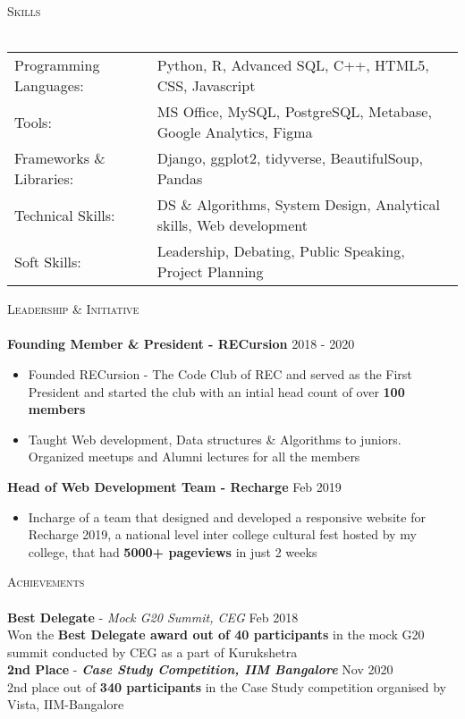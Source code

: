 \documentclass[a4paper]{article}
\newcommand{\lineunder} {
    \vspace*{-8pt} \\
    \hspace*{-18pt} \hrulefill \\
}
\newcommand{\header} [1] {
    {\hspace*{-18pt}\vspace*{6pt} \textsc{#1}}
    \vspace*{-6pt} \lineunder
}
\begin{document}
\header{Skills}
\begin{tabular}{ l l }
    Programming Languages: & Python, R, Advanced SQL, C++, HTML5, CSS, Javascript\\
    Tools:                 & MS Office, MySQL, PostgreSQL, Metabase, Google Analytics, Figma\\
    Frameworks \& Libraries:& Django, ggplot2, tidyverse, BeautifulSoup, Pandas\\
    Technical Skills:      & DS \& Algorithms, System Design, Analytical skills, Web development\\
    Soft Skills:           & Leadership, Debating, Public Speaking, Project Planning\\
\end{tabular}
\vspace{2mm}

\header{Leadership \& Initiative}
{\textbf{Founding Member \& President - RECursion}} \hfill 2018 - 2020
\begin{itemize} \itemsep 0.5pt
     \item Founded RECursion - The Code Club of REC and served as the First President and started the club with an intial head count of over \textbf{100 members}
     \item Taught Web development, Data structures \& Algorithms to juniors. Organized meetups and Alumni lectures for all the members
\end{itemize}
{\textbf{Head of Web Development Team - Recharge}} \hfill Feb 2019
\begin{itemize} \itemsep 0.5pt
     \item Incharge of a team that designed and developed a responsive website for Recharge 2019, a national level inter college cultural fest hosted by my college, that had \textbf{5000+ pageviews} in just 2 weeks
\end{itemize}
\vspace*{2mm}

\header{Achievements}
{\textbf{Best Delegate}} - {\sl Mock G20 Summit, CEG} \hfill Feb 2018\\
Won the \textbf{Best Delegate award out of 40 participants} in the mock G20 summit conducted by CEG as a part of Kurukshetra\\
\vspace*{2mm}
{\textbf{2nd Place}} - {\sl \textbf{Case Study Competition, IIM Bangalore}} \hfill Nov 2020\\
2nd place out of \textbf{340 participants} in the Case Study competition organised by Vista, IIM-Bangalore\\
\vspace*{2mm}


\ 
\end{document}
